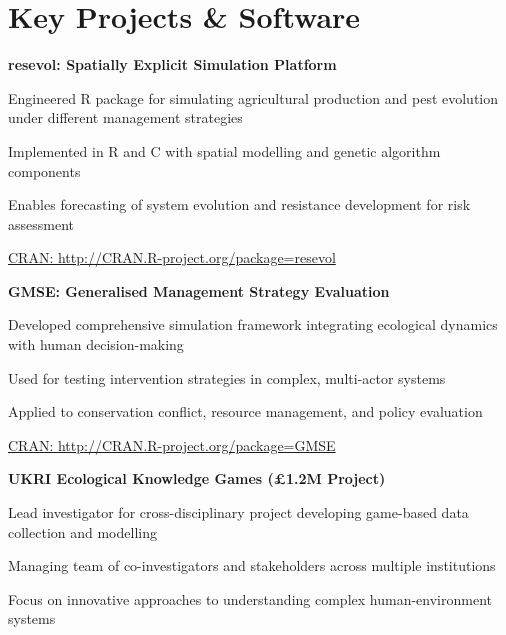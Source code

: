 \documentclass[letterpaper]{article}
\renewenvironment{itemize}{
  \begin{list}{}{
    \setlength{\leftmargin}{1.5em}
  }
}{
  \end{list}
}
\begin{document}
\section*{Key Projects \& Software}

\begin{itemize}
\item[] {\bf resevol: Spatially Explicit Simulation Platform} 
\begin{itemize}
    \item Engineered R package for simulating agricultural production and pest evolution under different management strategies
    \item Implemented in R and C with spatial modelling and genetic algorithm components
    \item Enables forecasting of system evolution and resistance development for risk assessment
    \item \href{http://CRAN.R-project.org/package=resevol}{CRAN: http://CRAN.R-project.org/package=resevol}
\end{itemize}
\end{itemize}

\begin{itemize}
\item[] {\bf GMSE: Generalised Management Strategy Evaluation}
\begin{itemize}
    \item Developed comprehensive simulation framework integrating ecological dynamics with human decision-making
    \item Used for testing intervention strategies in complex, multi-actor systems
    \item Applied to conservation conflict, resource management, and policy evaluation
    \item \href{http://CRAN.R-project.org/package=GMSE}{CRAN: http://CRAN.R-project.org/package=GMSE}
\end{itemize}
\end{itemize}

\begin{itemize}
\item[] {\bf UKRI Ecological Knowledge Games (£1.2M Project)}
\begin{itemize}
    \item Lead investigator for cross-disciplinary project developing game-based data collection and modelling
    \item Managing team of co-investigators and stakeholders across multiple institutions
    \item Focus on innovative approaches to understanding complex human-environment systems
\end{itemize}
\end{itemize}
\end{document}
